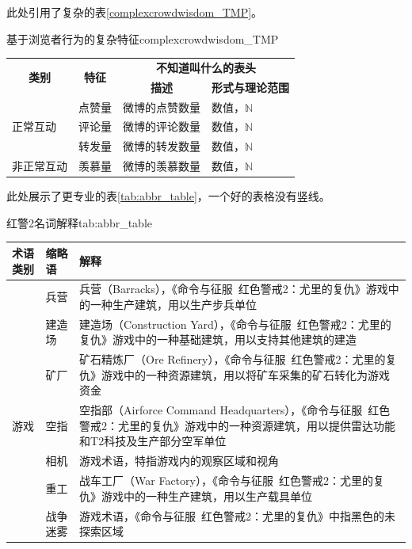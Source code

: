 \documentclass[a4paper,AutoFakeBold,oneside,12pt]{book}
\begin{document}
此处引用了复杂的表\ref{complexcrowdwisdom_TMP}。


\begin{bupttable}{基于浏览者行为的复杂特征}{complexcrowdwisdom_TMP}
    \begin{tabular}{l|l|l|l}
        \hline
        \multicolumn{1}{c|}{\multirow{2}{*}{\textbf{类别}}} & \multicolumn{1}{c|}{\multirow{2}{*}{\textbf{特征}}} & \multicolumn{2}{c}{\textbf{不知道叫什么的表头}} \\
        \cline{3-4}
        & & \multicolumn{1}{c|}{\textbf{描述}} & \multicolumn{1}{c}{\textbf{形式与理论范围}} \\
        \hline
        \multirow{3}{*}{正常互动} & 点赞量 & 微博的点赞数量 & 数值，$\mathbb{N}$ \\
        \cline{2-4}
        & 评论量 & 微博的评论数量 & 数值，$\mathbb{N}$ \\
        \cline{2-4}
        & 转发量 & 微博的转发数量 & 数值，$\mathbb{N}$ \\
        \hline
        非正常互动 & 羡慕量 & 微博的羡慕数量 & 数值，$\mathbb{N}$ \\
        \hline
    \end{tabular}
\end{bupttable}

此处展示了更专业的表\ref{tab:abbr_table}，一个好的表格没有竖线。
\begin{bupttable}{红警2名词解释}{tab:abbr_table}
    \begin{tabularx}{\textwidth}{llX}
        \toprule
        \textbf{术语类别} & \textbf{缩略语} & \textbf{解释} \\ \midrule
        & 兵营 & 兵营（Barracks），《命令与征服\ 红色警戒2：尤里的复仇》游戏中的一种生产建筑，用以生产步兵单位 \\ \cmidrule(l){2-3}
        & 建造场 & 建造场（Construction Yard），《命令与征服\ 红色警戒2：尤里的复仇》游戏中的一种基础建筑，用以支持其他建筑的建造 \\ \cmidrule(l){2-3}
        & 矿厂 & 矿石精炼厂（Ore Refinery），《命令与征服\ 红色警戒2：尤里的复仇》游戏中的一种资源建筑，用以将矿车采集的矿石转化为游戏资金 \\ \cmidrule(l){2-3}
        游戏 & 空指 & 空指部（Airforce Command Headquarters），《命令与征服\ 红色警戒2：尤里的复仇》游戏中的一种资源建筑，用以提供雷达功能和T2科技及生产部分空军单位 \\ \cmidrule(l){2-3}
        & 相机 & 游戏术语，特指游戏内的观察区域和视角 \\ \cmidrule(l){2-3}
        & 重工 & 战车工厂（War Factory），《命令与征服\ 红色警戒2：尤里的复仇》游戏中的一种生产建筑，用以生产载具单位 \\ \cmidrule(l){2-3}
        & 战争迷雾 & 游戏术语，《命令与征服\ 红色警戒2：尤里的复仇》中指黑色的未探索区域 \\ \bottomrule
    \end{tabularx}
\end{bupttable}
\end{document}
